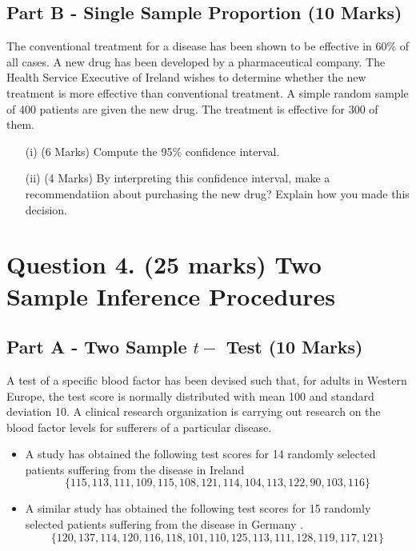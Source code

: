 \documentclass[a4paper,12pt]{article}
\begin{document}
\subsection*{Part B - Single Sample Proportion (10 Marks)}

The conventional treatment for a disease has been shown to be effective in 60\% of all 
cases. A new drug has been developed by a pharmaceutical company. The Health Service Executive of Ireland
wishes to determine whether the new treatment is more effective than conventional treatment. 
A simple random sample of 400 patients are given the new drug. The treatment is effective for 300 of them.


\begin{itemize}
	\item[(i)](6 Marks) Compute the 95\% confidence interval.
	\item[(ii)](4 Marks) By interpreting this confidence interval, make a recommendatiion about purchasing the new drug? Explain how you made this decision.
\end{itemize}




\section*{Question 4. (25 marks) Two Sample Inference Procedures}

\subsection*{Part A - Two Sample $t-$ Test (10 Marks)}
A test of a specific blood factor has been devised such that, for adults in Western Europe, the test score is normally distributed with mean 100 and standard deviation 10. A clinical research organization is carrying out research on the blood factor levels for sufferers of a particular disease.  

\begin{itemize}
	\item A study has obtained the following test scores for 14 randomly selected patients suffering from the disease in Ireland 
	\[ \{115, 113, 111, 109, 115, 108, 121, 114, 104, 113, 122, 90, 
	103, 116\}\]
	
	\item A similar study has obtained the following test scores for 15 randomly selected patients suffering from the disease in Germany .
	\[\{120, 137, 114, 120, 116, 118, 101, 110, 125, 113, 111, 128, 
	119, 117, 121\}\]
	
	\end{itemize}
	
\end{document}
